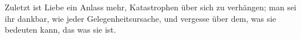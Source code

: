 Zuletzt ist Liebe ein Anlass mehr, Katastrophen über sich zu verhängen; man sei ihr dankbar, wie jeder Gelegenheitsursache, und vergesse über dem, was sie bedeuten kann, das was sie ist.
\par

